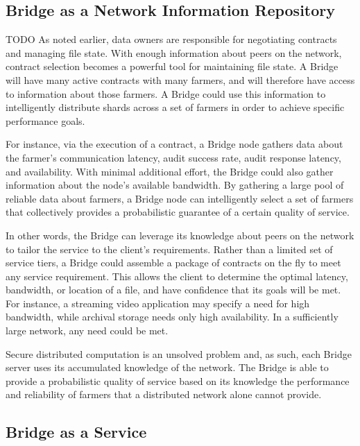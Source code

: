 \documentclass[a4paper,10pt]{article}
\newcommand{\todo}[1]{{\color{red} TODO #1}}
\begin{document}
\subsection{Bridge as a Network Information Repository}

\todo{
As noted earlier, data owners are responsible for negotiating contracts and
managing file state. With enough information about peers on the network,
contract selection becomes a powerful tool for maintaining file state. A Bridge
will have many active contracts with many farmers, and will therefore have
access to information about those farmers. A Bridge could use this information
to intelligently distribute shards across a set of farmers in order to achieve
specific performance goals.

For instance, via the execution of a contract, a Bridge node gathers data about
the farmer’s communication latency, audit success rate, audit response latency,
and availability. With minimal additional effort, the Bridge could also gather
information about the node’s available bandwidth. By gathering a large pool of
reliable data about farmers, a Bridge node can intelligently select a set of
farmers that collectively provides a probabilistic guarantee of a certain
quality of service.

In other words, the Bridge can leverage its knowledge about peers on the network
to tailor the service to the client’s requirements. Rather than a limited set of
service tiers, a Bridge could assemble a package of contracts on the fly to meet
any service requirement. This allows the client to determine the optimal
latency, bandwidth, or location of a file, and have confidence that its goals
will be met. For instance, a streaming video application may specify a need for
high bandwidth, while archival storage needs only high availability. In a
sufficiently large network, any need could be met.

Secure distributed computation is an unsolved problem and, as such, each Bridge
server uses its accumulated knowledge of the network. The Bridge is able to
provide a probabilistic quality of service based on its knowledge the
performance and reliability of farmers that a distributed network alone cannot
provide.
}

\subsection{Bridge as a Service}
\end{document}
